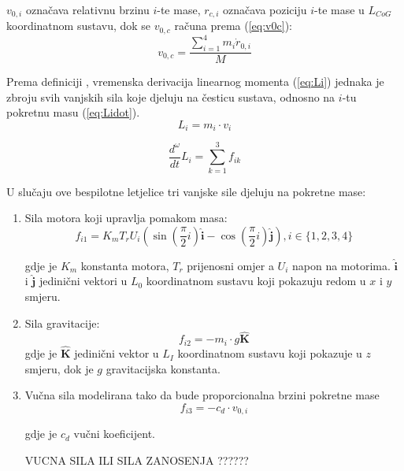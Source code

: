 \documentclass[11pt,a4paper]{article}
\begin{document}
$v_{0,i}$ označava relativnu brzinu $i$-te mase, $r_{c,i}$ označava poziciju $i$-te mase u $L_{CoG}$ koordinatnom sustavu, dok se $v_{0,c}$ računa prema (\ref{eq:v0c}):
\begin{equation}
 {v_{0,c} = \frac{\sum_{i=1}^{4}m_{i}\dot{r}_{0,i}}{M}}
\label{eq:v0c}
\end{equation}

Prema definiciji \cite{ilijic}, vremenska derivacija linearnog momenta (\ref{eq:Li}) jednaka je zbroju svih vanjskih sila koje djeluju na česticu sustava, odnosno na $i$-tu pokretnu masu (\ref{eq:Lidot}). 
\begin{equation}
 {L_{i} = m_{i} \cdot v_{i}}
\label{eq:Li}
\end{equation}

\begin{equation}
 {\frac{d^{\omega}}{dt} L_{i} = \sum_{k=1}^{3}f_{ik}}
\label{eq:Lidot}
\end{equation}

U slučaju ove bespilotne letjelice tri vanjske sile djeluju na pokretne mase:

\begin{enumerate}
 \item Sila motora koji upravlja pomakom masa:
\begin{equation}
f_{i1}  =K_{m}T_{r}U_{i}\left(\sin\left(\frac{\pi}{2}i\right) \bm{\hat{i}} - \cos\left( \frac{\pi}{2}i\right) \bm{\hat{j}}\right), i \in \{1,2,3,4\}
\label{eq:fi1}
\end{equation}

gdje je $K_{m}$ konstanta motora, $T_{r}$ prijenosni omjer a $U_{i}$ napon na motorima.  $\bm{\hat{i}}$ i  $\bm{\hat{j}}$ jedinični vektori u $L_{0}$ koordinatnom sustavu koji pokazuju redom u $x$ i $y$ smjeru.

\item Sila gravitacije:
\begin{equation}
f_{i2} = -m_{i}\cdot g \bm{\hat{K}}
\label{eq:fi2}
\end{equation}
gdje je  $\bm{\hat{K}}$ jedinični vektor u $L_{I}$ koordinatnom sustavu koji pokazuje u $z$ smjeru, dok je $g$ gravitacijska konstanta. 

\item Vučna sila modelirana tako da bude proporcionalna brzini pokretne mase
\begin{equation}
f_{i3} = -c_{d} \cdot v_{0,i}
\label{eq:fi3}
\end{equation}

gdje je $c_{d}$ vučni koeficijent.

VUCNA SILA ILI SILA ZANOSENJA ??????

\end{enumerate}
\end{document}

